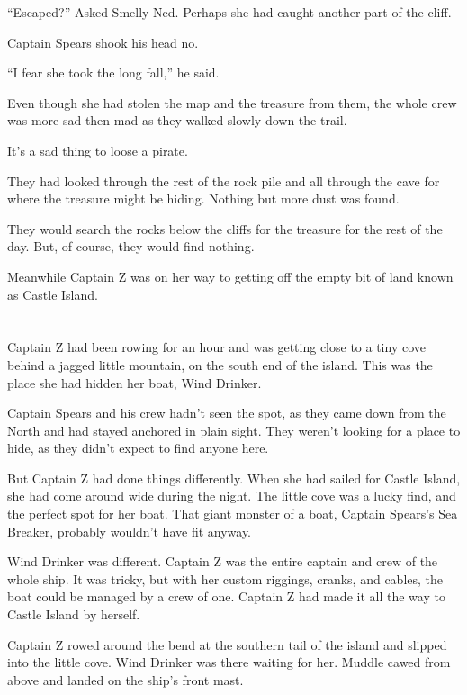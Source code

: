 \documentclass[12pt]{extbook}
\begin{document}
  \enquote{Escaped?} Asked Smelly Ned. Perhaps she had caught another part
  of the cliff.
  
  Captain Spears shook his head no.
  
  \enquote{I fear she took the long fall,} he said.
  
  Even though she had stolen the map and the treasure from them, the whole
  crew was more sad then mad as they walked slowly down the trail.
  
  It's a sad thing to loose a pirate.
  
  They had looked through the rest of the rock pile and all through the
  cave for where the treasure might be hiding. Nothing but more dust was
  found.
  
  They would search the rocks below the cliffs for the treasure for the
  rest of the day. But, of course, they would find nothing.
  
  Meanwhile Captain Z was on her way to getting off the empty bit of land
  known as Castle Island.
  
  \section{}\label{section-24}
  
  Captain Z had been rowing for an hour and was getting close to a tiny
  cove behind a jagged little mountain, on the south end of the island.
  This was the place she had hidden her boat, Wind Drinker.
  
  Captain Spears and his crew hadn't seen the spot, as they came down from
  the North and had stayed anchored in plain sight. They weren't looking
  for a place to hide, as they didn't expect to find anyone here.
  
  But Captain Z had done things differently. When she had sailed for
  Castle Island, she had come around wide during the night. The little
  cove was a lucky find, and the perfect spot for her boat. That giant
  monster of a boat, Captain Spears's Sea Breaker, probably wouldn't have
  fit anyway.
  
  Wind Drinker was different. Captain Z was the entire captain and crew of
  the whole ship. It was tricky, but with her custom riggings, cranks, and
  cables, the boat could be managed by a crew of one. Captain Z had made
  it all the way to Castle Island by herself.
  
  Captain Z rowed around the bend at the southern tail of the island and
  slipped into the little cove. Wind Drinker was there waiting for her.
  Muddle cawed from above and landed on the ship's front mast.
  
\end{document}
